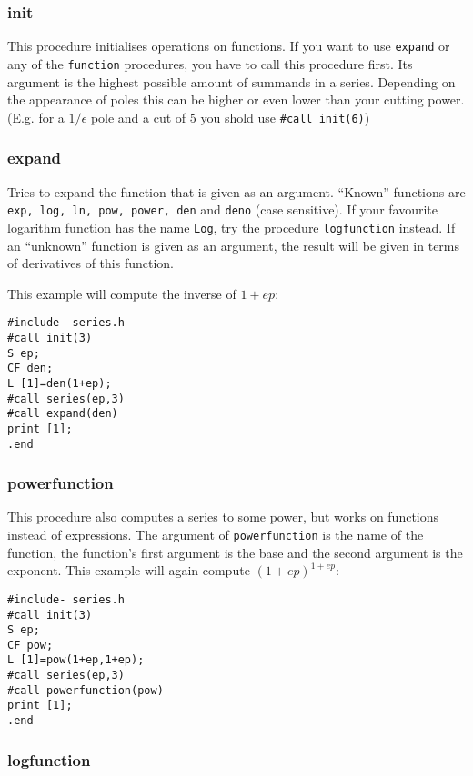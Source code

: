 \documentclass{article}
\begin{document}
\subsubsection{init}
\label{sec:invert}

This procedure initialises operations on functions. If you want to use
{\tt expand} or any of the {\tt *function} procedures, you have to call
this procedure first. Its argument is the highest possible amount of
summands in a series. Depending on the appearance of poles this can be
higher or even lower than your cutting power. (E.g. for a $1/\epsilon$
pole and a cut of $5$ you shold use {\tt \#call init(6)})

\subsubsection{expand}
\label{sec:expand}

Tries to expand the function that is given as an argument. ``Known''
functions are {\tt exp, log, ln, pow, power, den} and {\tt deno} (case sensitive). If
your favourite logarithm function has the name {\tt Log}, try the
procedure {\tt logfunction} instead. If an ``unknown'' function is given
as an argument, the result will be given in terms of derivatives of this function.

This example will compute the
inverse of $1+ep$:
\begin{verbatim}
#include- series.h
#call init(3)
S ep;
CF den;
L [1]=den(1+ep);
#call series(ep,3)
#call expand(den)
print [1];
.end
\end{verbatim}

\subsubsection{powerfunction}
\label{sec:pow_fun}

This procedure also computes a series to some power, but works on
functions instead of expressions. The argument of {\tt powerfunction} is
the name of the function, the function's first argument is the base and
the second argument is the exponent. This example will again compute $(1+ep)^{1+ep}$:
\begin{verbatim}
#include- series.h
#call init(3)
S ep;
CF pow;
L [1]=pow(1+ep,1+ep);
#call series(ep,3)
#call powerfunction(pow)
print [1];
.end
\end{verbatim}

\subsubsection{logfunction}
\label{sec:log_fun}
\end{document}
